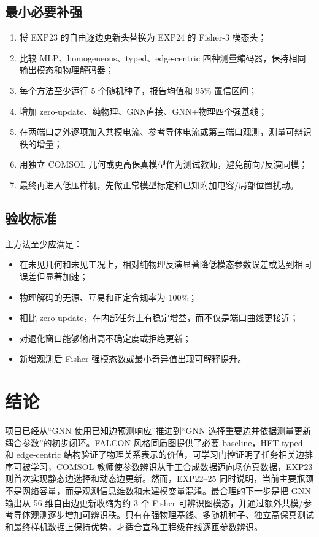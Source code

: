 \documentclass[UTF8,11pt,a4paper]{ctexart}
\begin{document}
\subsection{最小必要补强}
\begin{enumerate}
  \item 将 EXP23 的自由逐边更新头替换为 EXP24 的 Fisher-3 模态头；
  \item 比较 MLP、homogeneous、typed、edge-centric 四种测量编码器，保持相同输出模态和物理解码器；
  \item 每个方法至少运行 5 个随机种子，报告均值和 95\% 置信区间；
  \item 增加 zero-update、纯物理、GNN直接、GNN+物理四个强基线；
  \item 在两端口之外逐项加入共模电流、参考导体电流或第三端口观测，测量可辨识秩的增量；
  \item 用独立 COMSOL 几何或更高保真模型作为测试教师，避免前向/反演同模；
  \item 最终再进入低压样机，先做正常模型标定和已知附加电容/局部位置扰动。
\end{enumerate}

\subsection{验收标准}
主方法至少应满足：
\begin{itemize}
  \item 在未见几何和未见工况上，相对纯物理反演显著降低模态参数误差或达到相同误差但显著加速；
  \item 物理解码的无源、互易和正定合规率为 100\%；
  \item 相比 zero-update，在内部任务上有稳定增益，而不仅是端口曲线更接近；
  \item 对退化窗口能够输出高不确定度或拒绝更新；
  \item 新增观测后 Fisher 强模态数或最小奇异值出现可解释提升。
\end{itemize}

\section{结论}
项目已经从“GNN 使用已知边预测响应”推进到“GNN 选择重要边并依据测量更新耦合参数”的初步闭环。FALCON 风格同质图提供了必要 baseline，HFT typed 和 edge-centric 结构验证了物理关系表示的价值，可学习门控证明了任务相关边排序可被学习，COMSOL 教师使参数辨识从手工合成数据迈向场仿真数据，EXP23 则首次实现静态边选择和动态边更新。然而，EXP22--25 同时说明，当前主要瓶颈不是网络容量，而是观测信息维数和未建模变量混淆。最合理的下一步是把 GNN 输出从 56 维自由边更新收缩为约 3 个 Fisher 可辨识图模态，并通过额外共模/参考导体观测逐步增加可辨识秩。只有在强物理基线、多随机种子、独立高保真测试和最终样机数据上保持优势，才适合宣称工程级在线逐匝参数辨识。
\end{document}
